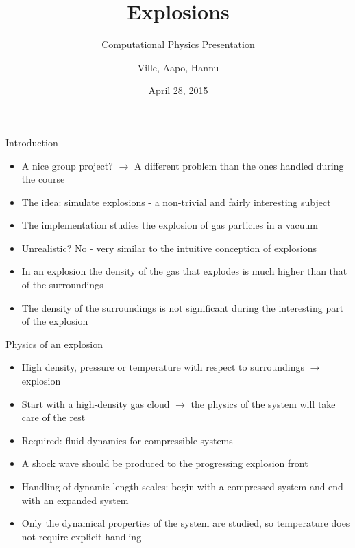 \documentclass{beamer}
\title[Explosions]{Explosions}
\subtitle{Computational Physics Presentation}
\author{Ville, Aapo, Hannu}
\date{April 28, 2015}
\begin{document}
\begin{frame}
\titlepage
\end{frame}

\begin{frame}{Introduction}
\begin{itemize}

\item A nice group project? $\rightarrow$ A different problem than the ones handled during the course
\item The idea: simulate explosions - a non-trivial and fairly interesting subject
\item The implementation studies the explosion of gas particles in a vacuum
\item Unrealistic? No - very similar to the intuitive conception of explosions
\item In an explosion the density of the gas that explodes is much higher than that of the surroundings
\item The density of the surroundings is not significant during the interesting part of the explosion

\end{itemize}
\end{frame}


\begin{frame}{Physics of an explosion}
\begin{itemize}

\item High density, pressure or temperature with respect to surroundings $\rightarrow$ explosion
\item Start with a high-density gas cloud $\rightarrow$ the physics of the system will take care of the rest
\item Required: fluid dynamics for compressible systems
\item A shock wave should be produced to the progressing explosion front
\item Handling of dynamic length scales: begin with a compressed system and end with an expanded system
\item Only the dynamical properties of the system are studied, so temperature does not require explicit handling

\end{itemize}
\end{frame}
\end{document}
